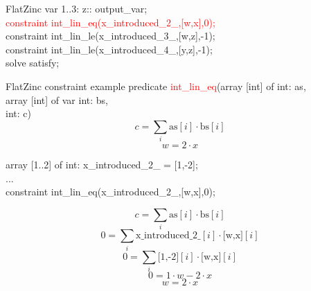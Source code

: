 \documentclass[mathserif,table]{gkibeamer-aaai}
\begin{document}
\begin{frame}{FlatZinc}
{	\hspace{1cm}
	var 1..3: z:: output\_var; \\
	\vspace{0.35cm}
	\hspace{1cm}
	\textcolor{red}{constraint int\_lin\_eq(x\_introduced\_2\_,[w,x],0);} \\
	\hspace{1cm}
	constraint int\_lin\_le(x\_introduced\_3\_,[w,z],-1); \\
	\hspace{1cm}
	constraint int\_lin\_le(x\_introduced\_4\_,[y,z],-1); \\
	\vspace{0.35cm}
	\hspace{1cm}
	solve  satisfy;
	}
\end{frame}

\begin{frame}{FlatZinc constraint example}
	\hspace{1cm}
	predicate \textcolor{red}{int\_lin\_eq}(array [int] of int: as,\\
	\hspace{4.2cm} array [int] of var int: bs,\\
	\hspace{4.2cm} int: c)
	\pause
	\vspace{0.6cm}
	\begin{equation*}
		c = \sum_{i} \text{as}[i] \cdot \text{bs}[i]
	\end{equation*}
	\pause
	\vspace{0.6cm}
	\begin{equation*}
		w = 2 \cdot x
	\end{equation*}
\end{frame}

\begin{frame}
	\hspace{1cm}
	array [1..2] of int: x\_introduced\_2\_ = [1,-2]; \\
	\hspace{1cm}
	... \\
	\hspace{1cm}
	constraint int\_lin\_eq(x\_introduced\_2\_,[w,x],0); \\

	\pause

	\begin{equation*}
		c = \sum_{i} \text{as}[i] \cdot \text{bs}[i]
	\end{equation*}
	\pause
	\begin{equation*}
		0 = \sum_{i} \text{x\_introduced\_2\_}[i] \cdot \text{[w,x]}[i]
	\end{equation*}
	\pause
	\begin{equation*}
		0 = \sum_{i} \text{[1,-2]}[i] \cdot \text{[w,x]}[i]
	\end{equation*}
	\pause
	\begin{equation*}
		0 = 1 \cdot w - 2 \cdot x
	\end{equation*}
	\pause
	\begin{equation*}
		w = 2 \cdot x
	\end{equation*}
\end{frame}
\end{document}
